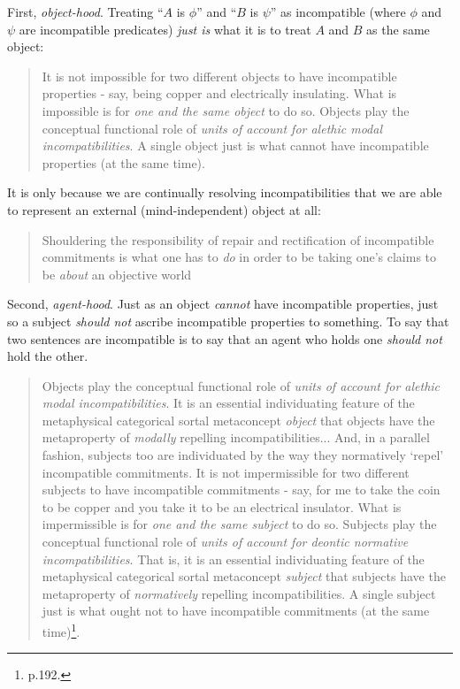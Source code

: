 First, \emph{object-hood}.
Treating ``$A$ is $\phi$'' and ``$B$ is $\psi$'' as incompatible (where $\phi$ and $\psi$ are incompatible predicates) \emph{just is} what it is to treat $A$ and $B$ as the same object:
\begin{quote}
It is not impossible for two different objects to have incompatible properties - say, being copper and electrically insulating. What is impossible is for \emph{one and the same object} to do so. 
Objects play the conceptual functional role of \emph{units of account for alethic modal incompatibilities}. 
A single object just is what cannot have incompatible properties (at the same time).
\end{quote}
It is only because we are continually resolving incompatibilities that we are able to represent an external (mind-independent) object at all:
\begin{quote}
Shouldering the responsibility of repair and rectification of incompatible commitments is what one has to \emph{do} in order to be taking one's claims to be \emph{about} an objective world
\end{quote}
Second, \emph{agent-hood}.
Just as an object \emph{cannot} have incompatible properties, just so a subject \emph{should not} ascribe incompatible properties to something.
To say that two sentences are incompatible is to say that an agent who holds one \emph{should not} hold the other.
\begin{quote}
Objects play the conceptual functional role of \emph{units of account for alethic modal incompatibilities}. 
It is an essential individuating feature of the metaphysical categorical sortal metaconcept \emph{object} that objects have the metaproperty of \emph{modally} repelling incompatibilities...
And, in a parallel fashion, subjects too are individuated by the way they normatively `repel' incompatible commitments.
It is not impermissible for two different subjects to have incompatible commitments - say, for me to take the coin to be copper and you take it to be an electrical insulator. What is impermissible is for \emph{one and the same subject} to do so. Subjects play the conceptual functional role of \emph{units of account for deontic normative incompatibilities}. 
That is, it is an essential individuating feature of the metaphysical categorical sortal metaconcept \emph{subject} that subjects have the metaproperty of \emph{normatively} repelling incompatibilities. A single subject just is what ought not to have incompatible commitments (at the same time)\footnote{\cite{brandom} p.192.}.
\end{quote}

